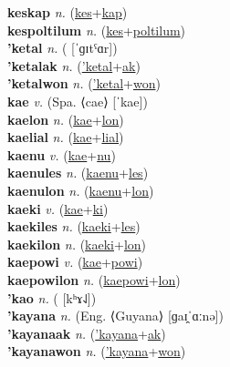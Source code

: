 \textbf{keskap} \textit{n.} (\hyperref[kes]{kes}+\hyperref[kap]{kap})
 \label{keskap} \\
\textbf{kespoltilum} \textit{n.} (\hyperref[kes]{kes}+\hyperref[poltilum]{poltilum})
 \label{kespoltilum} \\
\textbf{'ketal} \textit{n.} ( [ˈɡɪtˤɑr])
 \label{'ketal} \\
\textbf{'ketalak} \textit{n.} (\hyperref['ketal]{'ketal}+\hyperref[ak]{ak})
 \label{'ketalak} \\
\textbf{'ketalwon} \textit{n.} (\hyperref['ketal]{'ketal}+\hyperref[won]{won})
 \label{'ketalwon} \\
\textbf{kae} \textit{v.} (Spa. ⟨cae⟩ [ˈkae])
 \label{kae} \\
\textbf{kaelon} \textit{n.} (\hyperref[kae]{kae}+\hyperref[lon]{lon})
 \label{kaelon} \\
\textbf{kaelial} \textit{n.} (\hyperref[kae]{kae}+\hyperref[lial]{lial})
 \label{kaelial} \\
\textbf{kaenu} \textit{v.} (\hyperref[kae]{kae}+\hyperref[nu]{nu})
 \label{kaenu} \\
\textbf{kaenules} \textit{n.} (\hyperref[kaenu]{kaenu}+\hyperref[les]{les})
 \label{kaenules} \\
\textbf{kaenulon} \textit{n.} (\hyperref[kaenu]{kaenu}+\hyperref[lon]{lon})
 \label{kaenulon} \\
\textbf{kaeki} \textit{v.} (\hyperref[kae]{kae}+\hyperref[ki]{ki})
 \label{kaeki} \\
\textbf{kaekiles} \textit{n.} (\hyperref[kaeki]{kaeki}+\hyperref[les]{les})
 \label{kaekiles} \\
\textbf{kaekilon} \textit{n.} (\hyperref[kaeki]{kaeki}+\hyperref[lon]{lon})
 \label{kaekilon} \\
\textbf{kaepowi} \textit{v.} (\hyperref[kae]{kae}+\hyperref[powi]{powi})
 \label{kaepowi} \\
\textbf{kaepowilon} \textit{n.} (\hyperref[kaepowi]{kaepowi}+\hyperref[lon]{lon})
 \label{kaepowilon} \\
\textbf{'kao} \textit{n.} ( [kʰɤ˨˩])
 \label{'kao} \\
\textbf{'kayana} \textit{n.} (Eng. ⟨Guyana⟩ [ɡaɪ̯ˈɑːnə])
 \label{'kayana} \\
\textbf{'kayanaak} \textit{n.} (\hyperref['kayana]{'kayana}+\hyperref[ak]{ak})
 \label{'kayanaak} \\
\textbf{'kayanawon} \textit{n.} (\hyperref['kayana]{'kayana}+\hyperref[won]{won})
 \label{'kayanawon} \\
